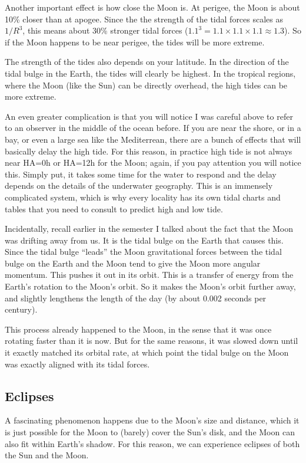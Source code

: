 \documentclass[12pt, preprint]{aastex}
\begin{document}
Another important effect is how close the Moon is. At perigee, the
Moon is about 10\% closer than at apogee. Since the the strength of
the tidal forces scales as $1/R^3$, this means about 30\% stronger
tidal forces ($1.1^3 = 1.1\times1.1\times 1.1\approx 1.3$). So if the
Moon happens to be near perigee, the tides will be more extreme.

The strength of the tides also depends on your latitude. In the
direction of the tidal bulge in the Earth, the tides will clearly be
highest. In the tropical regions, where the Moon (like the Sun) can be
directly overhead, the high tides can be more extreme.

An even greater complication is that you will notice I was careful
above to refer to an observer in the middle of the ocean before. If
you are near the shore, or in a bay, or even a large sea like the
Mediterrean, there are a bunch of effects that will basically delay
the high tide. For this reason, in practice high tide is not always
near HA=0h or HA=12h for the Moon; again, if you pay attention you
will notice this. Simply put, it takes some time for the water to
respond and the delay depends on the details of the underwater
geography. This is an immensely complicated system, which is why every
locality has its own tidal charts and tables that you need to consult
to predict high and low tide. 

Incidentally, recall earlier in the semester I talked about the fact
that the Moon was drifting away from us. It is the tidal bulge on the
Earth that causes this. Since the tidal bulge ``leads'' the Moon
gravitational forces between the tidal bulge on the Earth and the Moon
tend to give the Moon more angular momentum. This pushes it out in its
orbit. This is a transfer of energy from the Earth's rotation to the
Moon's orbit. So it makes the Moon's orbit further away, and slightly
lengthens the length of the day (by about 0.002 seconds per century).

This process already happened to the Moon, in the sense that it was
once rotating faster than it is now. But for the same reasons, it was
slowed down until it exactly matched its orbital rate, at which point
the tidal bulge on the Moon was exactly aligned with its tidal forces.

\subsection{Eclipses}

A fascinating phenomenon happens due to the Moon's size and distance,
which it is just possible for the Moon to (barely) cover the Sun's
disk, and the Moon can also fit within Earth's shadow. For this
reason, we can experience eclipses of both the Sun and the Moon.
\end{document}
